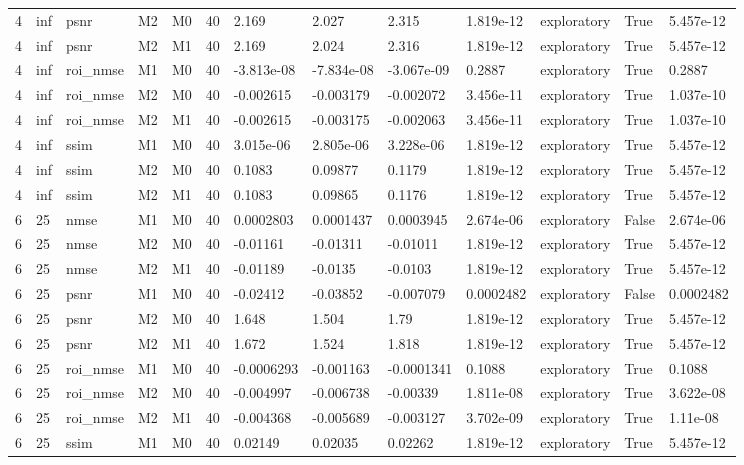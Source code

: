 \begin{tabular}{lllllllllllll}
4 & inf & psnr & M2 & M0 & 40 & 2.169 & 2.027 & 2.315 & 1.819e-12 & exploratory & True & 5.457e-12 \\
4 & inf & psnr & M2 & M1 & 40 & 2.169 & 2.024 & 2.316 & 1.819e-12 & exploratory & True & 5.457e-12 \\
4 & inf & roi\_nmse & M1 & M0 & 40 & -3.813e-08 & -7.834e-08 & -3.067e-09 & 0.2887 & exploratory & True & 0.2887 \\
4 & inf & roi\_nmse & M2 & M0 & 40 & -0.002615 & -0.003179 & -0.002072 & 3.456e-11 & exploratory & True & 1.037e-10 \\
4 & inf & roi\_nmse & M2 & M1 & 40 & -0.002615 & -0.003175 & -0.002063 & 3.456e-11 & exploratory & True & 1.037e-10 \\
4 & inf & ssim & M1 & M0 & 40 & 3.015e-06 & 2.805e-06 & 3.228e-06 & 1.819e-12 & exploratory & True & 5.457e-12 \\
4 & inf & ssim & M2 & M0 & 40 & 0.1083 & 0.09877 & 0.1179 & 1.819e-12 & exploratory & True & 5.457e-12 \\
4 & inf & ssim & M2 & M1 & 40 & 0.1083 & 0.09865 & 0.1176 & 1.819e-12 & exploratory & True & 5.457e-12 \\
6 & 25 & nmse & M1 & M0 & 40 & 0.0002803 & 0.0001437 & 0.0003945 & 2.674e-06 & exploratory & False & 2.674e-06 \\
6 & 25 & nmse & M2 & M0 & 40 & -0.01161 & -0.01311 & -0.01011 & 1.819e-12 & exploratory & True & 5.457e-12 \\
6 & 25 & nmse & M2 & M1 & 40 & -0.01189 & -0.0135 & -0.0103 & 1.819e-12 & exploratory & True & 5.457e-12 \\
6 & 25 & psnr & M1 & M0 & 40 & -0.02412 & -0.03852 & -0.007079 & 0.0002482 & exploratory & False & 0.0002482 \\
6 & 25 & psnr & M2 & M0 & 40 & 1.648 & 1.504 & 1.79 & 1.819e-12 & exploratory & True & 5.457e-12 \\
6 & 25 & psnr & M2 & M1 & 40 & 1.672 & 1.524 & 1.818 & 1.819e-12 & exploratory & True & 5.457e-12 \\
6 & 25 & roi\_nmse & M1 & M0 & 40 & -0.0006293 & -0.001163 & -0.0001341 & 0.1088 & exploratory & True & 0.1088 \\
6 & 25 & roi\_nmse & M2 & M0 & 40 & -0.004997 & -0.006738 & -0.00339 & 1.811e-08 & exploratory & True & 3.622e-08 \\
6 & 25 & roi\_nmse & M2 & M1 & 40 & -0.004368 & -0.005689 & -0.003127 & 3.702e-09 & exploratory & True & 1.11e-08 \\
6 & 25 & ssim & M1 & M0 & 40 & 0.02149 & 0.02035 & 0.02262 & 1.819e-12 & exploratory & True & 5.457e-12 \\

\end{tabular}
